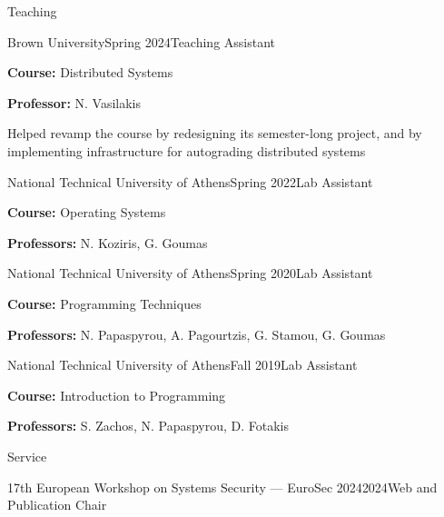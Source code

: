 \documentclass[letterpaper, 12pt]{resume}
\begin{document}
\begin{rSection}{Teaching}
    \begin{rSubsection}{Brown University}{Spring 2024}{Teaching Assistant}{}
        \item \textbf{Course:} Distributed Systems
        \item \textbf{Professor:} N. Vasilakis
        \item Helped revamp the course by redesigning its semester-long project, and by implementing infrastructure for autograding distributed systems
    \end{rSubsection}

    \begin{rSubsection}{National Technical University of Athens}{Spring 2022}{Lab Assistant}{}
        \item \textbf{Course:} Operating Systems
        \item \textbf{Professors:} N. Koziris, G. Goumas
    \end{rSubsection}

    \begin{rSubsection}{National Technical University of Athens}{Spring 2020}{Lab Assistant}{}
        \item \textbf{Course:} Programming Techniques
        \item \textbf{Professors:} N. Papaspyrou, A. Pagourtzis, G. Stamou, G. Goumas
    \end{rSubsection}

    \begin{rSubsection}{National Technical University of Athens}{Fall 2019}{Lab Assistant}{}
        \item \textbf{Course:} Introduction to Programming
        \item \textbf{Professors:} S. Zachos, N. Papaspyrou, D. Fotakis
    \end{rSubsection}
\end{rSection}



\begin{rSection}{Service}
    \begin{rSubsection}{17th European Workshop on Systems Security --- EuroSec 2024}{2024}{Web and Publication Chair}{}
        \item[]
    \end{rSubsection}
    \vspace{-4ex}
\end{rSection}
\end{document}
